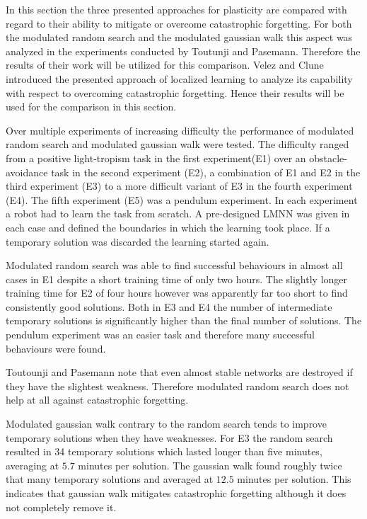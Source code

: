 \documentclass[12pt,twoside]{scrartcl}
\theoremstyle{plain}
\theoremstyle{definition}
\theoremstyle{remark}
\begin{document}
In this section the three presented approaches for plasticity are compared with
regard to their ability to mitigate or overcome catastrophic forgetting. For both
the modulated random search and the modulated gaussian walk this aspect was
analyzed in the experiments conducted by Toutunji and Pasemann\cite{Toutounji2016}.
Therefore the results of their work will be utilized for this comparison.
Velez and Clune\cite{Velez2017} introduced the presented approach of localized
learning to analyze its capability with respect to overcoming catastrophic
forgetting. Hence their results will be used for the comparison in this section.

Over multiple experiments of increasing difficulty the performance of modulated
random search and modulated gaussian walk were tested. The difficulty ranged
from a positive light-tropism task in the first experiment(E1) over an
obstacle-avoidance task in the second experiment (E2), a combination of E1 and E2
in the third experiment (E3) to a more difficult variant of E3 in the fourth
experiment (E4). The fifth experiment (E5) was a pendulum experiment.
In each experiment a robot had to learn the task from scratch. A pre-designed
LMNN was given in each case and defined the boundaries in which the learning
took place. If a temporary solution was discarded the learning started again.

Modulated random search was able to find successful behaviours in almost all
cases in E1 despite a short training time of only two hours. The slightly
longer training time for E2 of four hours however was apparently far too short
to find consistently good solutions. Both in E3 and E4 the number of intermediate
temporary solutions is significantly higher than the final number of solutions.
The pendulum experiment was an easier task and therefore many successful
behaviours were found.

Toutounji and Pasemann note that even almost stable networks are destroyed
if they have the slightest weakness. Therefore modulated random search
does not help at all against catastrophic forgetting.

Modulated gaussian walk contrary to the random search tends to improve temporary
solutions when they have weaknesses. For E3 the random search resulted in 34
temporary solutions which lasted longer than five minutes, averaging at \(5.7\)
minutes per solution. The gaussian walk found roughly twice that many temporary
solutions and averaged at \(12.5\) minutes per solution. This indicates that
gaussian walk mitigates catastrophic forgetting although it does not completely
remove it.
\end{document}
